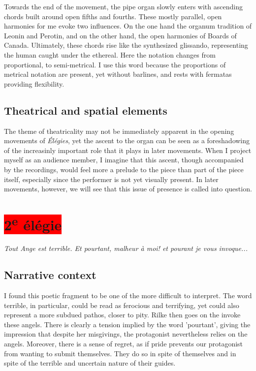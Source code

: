 \documentclass[12pt,twoside,maitrise]{dms_ks}
\theoremstyle{definition}
\begin{document}
{

Towards the end of the movement, the pipe organ slowly enters with ascending chords built around open fifths and fourths.
These mostly parallel, open harmonies for me evoke two influences.
On the one hand the organum tradition of Leonin and Perotin, and on the other hand, the open harmonies of Boards of Canada.
Ultimately, these chords rise like the synthesized glissando, representing the human caught under the ethereal.
Here the notation changes from proportional, to semi-metrical.
I use this word because the proportions of metrical notation are present, yet without barlines, and rests with fermatas providing flexibility.


\subsection{Theatrical and spatial elements}

The theme of theatricality may not be immediately apparent in the opening movements of \textit{Élégies}, yet the ascent to the organ can be seen as a foreshadowing of the increasinly important role that it plays in later movements.
When I project myself as an audience member, I imagine that this ascent, though accompanied by the recordings, would feel more a prelude to the piece than part of the piece itself, especially since the performer is not yet visually present.
In later movements, however, we will see that this issue of presence is called into question.

\section{\colorbox{red}{2\textsuperscript{e} élégie}}

\epigraph{\textit{Tout Ange est terrible. Et pourtant, malheur à moi! et pourant je vous invoque...}}{}

\subsection{Narrative context}

I found this poetic fragment to be one of the more difficult to interpret. 
The word terrible, in particular, could be read as ferocious and terrifying, yet could also represent a more subdued pathos, closer to pity.
Rilke then goes on the invoke these angels.
There is clearly a tension implied by the word 'pourtant', giving the impression that despite her misgivings, the protagonist nevertheless relies on the angels.
Moreover, there is a sense of regret, as if pride prevents our protagonist from wanting to submit themselves.
They do so in spite of themselves and in spite of the terrible and uncertain nature of their guides.

}
\end{document}

